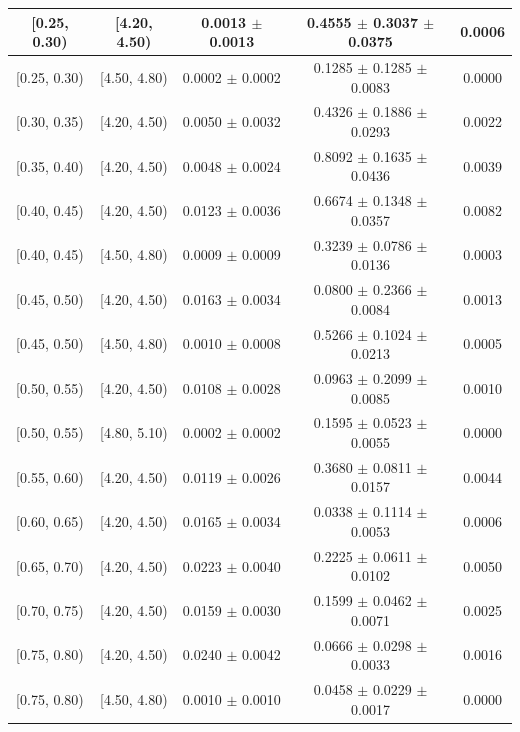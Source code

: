 \begin{longtable}{|c|c|c|c|c|}
\hline
\endlastfoot
[0.25, 0.30) & [4.20, 4.50) & 0.0013 $\pm$ 0.0013 & 0.4555 $\pm$ 0.3037 $\pm$ 0.0375 & 0.0006 \\ 
\hline
[0.25, 0.30) & [4.50, 4.80) & 0.0002 $\pm$ 0.0002 & 0.1285 $\pm$ 0.1285 $\pm$ 0.0083 & 0.0000 \\ 
\hline
[0.30, 0.35) & [4.20, 4.50) & 0.0050 $\pm$ 0.0032 & 0.4326 $\pm$ 0.1886 $\pm$ 0.0293 & 0.0022 \\ 
\hline
[0.35, 0.40) & [4.20, 4.50) & 0.0048 $\pm$ 0.0024 & 0.8092 $\pm$ 0.1635 $\pm$ 0.0436 & 0.0039 \\ 
\hline
[0.40, 0.45) & [4.20, 4.50) & 0.0123 $\pm$ 0.0036 & 0.6674 $\pm$ 0.1348 $\pm$ 0.0357 & 0.0082 \\ 
\hline
[0.40, 0.45) & [4.50, 4.80) & 0.0009 $\pm$ 0.0009 & 0.3239 $\pm$ 0.0786 $\pm$ 0.0136 & 0.0003 \\ 
\hline
[0.45, 0.50) & [4.20, 4.50) & 0.0163 $\pm$ 0.0034 & 0.0800 $\pm$ 0.2366 $\pm$ 0.0084 & 0.0013 \\ 
\hline
[0.45, 0.50) & [4.50, 4.80) & 0.0010 $\pm$ 0.0008 & 0.5266 $\pm$ 0.1024 $\pm$ 0.0213 & 0.0005 \\ 
\hline
[0.50, 0.55) & [4.20, 4.50) & 0.0108 $\pm$ 0.0028 & 0.0963 $\pm$ 0.2099 $\pm$ 0.0085 & 0.0010 \\ 
\hline
[0.50, 0.55) & [4.80, 5.10) & 0.0002 $\pm$ 0.0002 & 0.1595 $\pm$ 0.0523 $\pm$ 0.0055 & 0.0000 \\ 
\hline
[0.55, 0.60) & [4.20, 4.50) & 0.0119 $\pm$ 0.0026 & 0.3680 $\pm$ 0.0811 $\pm$ 0.0157 & 0.0044 \\ 
\hline
[0.60, 0.65) & [4.20, 4.50) & 0.0165 $\pm$ 0.0034 & 0.0338 $\pm$ 0.1114 $\pm$ 0.0053 & 0.0006 \\ 
\hline
[0.65, 0.70) & [4.20, 4.50) & 0.0223 $\pm$ 0.0040 & 0.2225 $\pm$ 0.0611 $\pm$ 0.0102 & 0.0050 \\ 
\hline
[0.70, 0.75) & [4.20, 4.50) & 0.0159 $\pm$ 0.0030 & 0.1599 $\pm$ 0.0462 $\pm$ 0.0071 & 0.0025 \\ 
\hline
[0.75, 0.80) & [4.20, 4.50) & 0.0240 $\pm$ 0.0042 & 0.0666 $\pm$ 0.0298 $\pm$ 0.0033 & 0.0016 \\ 
\hline
[0.75, 0.80) & [4.50, 4.80) & 0.0010 $\pm$ 0.0010 & 0.0458 $\pm$ 0.0229 $\pm$ 0.0017 & 0.0000 \\ 
\hline
\end{longtable}
